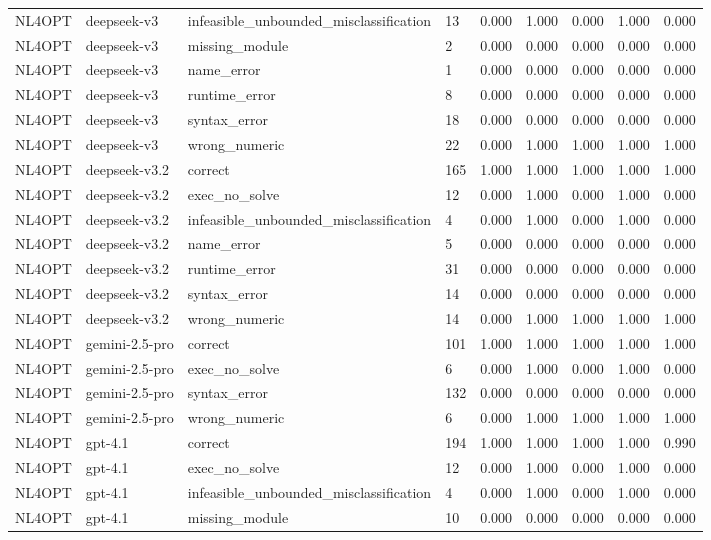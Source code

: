 \begin{table}[t]
\begin{tabular}{lllllllll}
NL4OPT & deepseek-v3 & infeasible\_unbounded\_misclassification & 13 & 0.000 & 1.000 & 0.000 & 1.000 & 0.000 \\
NL4OPT & deepseek-v3 & missing\_module & 2 & 0.000 & 0.000 & 0.000 & 0.000 & 0.000 \\
NL4OPT & deepseek-v3 & name\_error & 1 & 0.000 & 0.000 & 0.000 & 0.000 & 0.000 \\
NL4OPT & deepseek-v3 & runtime\_error & 8 & 0.000 & 0.000 & 0.000 & 0.000 & 0.000 \\
NL4OPT & deepseek-v3 & syntax\_error & 18 & 0.000 & 0.000 & 0.000 & 0.000 & 0.000 \\
NL4OPT & deepseek-v3 & wrong\_numeric & 22 & 0.000 & 1.000 & 1.000 & 1.000 & 1.000 \\
NL4OPT & deepseek-v3.2 & correct & 165 & 1.000 & 1.000 & 1.000 & 1.000 & 1.000 \\
NL4OPT & deepseek-v3.2 & exec\_no\_solve & 12 & 0.000 & 1.000 & 0.000 & 1.000 & 0.000 \\
NL4OPT & deepseek-v3.2 & infeasible\_unbounded\_misclassification & 4 & 0.000 & 1.000 & 0.000 & 1.000 & 0.000 \\
NL4OPT & deepseek-v3.2 & name\_error & 5 & 0.000 & 0.000 & 0.000 & 0.000 & 0.000 \\
NL4OPT & deepseek-v3.2 & runtime\_error & 31 & 0.000 & 0.000 & 0.000 & 0.000 & 0.000 \\
NL4OPT & deepseek-v3.2 & syntax\_error & 14 & 0.000 & 0.000 & 0.000 & 0.000 & 0.000 \\
NL4OPT & deepseek-v3.2 & wrong\_numeric & 14 & 0.000 & 1.000 & 1.000 & 1.000 & 1.000 \\
NL4OPT & gemini-2.5-pro & correct & 101 & 1.000 & 1.000 & 1.000 & 1.000 & 1.000 \\
NL4OPT & gemini-2.5-pro & exec\_no\_solve & 6 & 0.000 & 1.000 & 0.000 & 1.000 & 0.000 \\
NL4OPT & gemini-2.5-pro & syntax\_error & 132 & 0.000 & 0.000 & 0.000 & 0.000 & 0.000 \\
NL4OPT & gemini-2.5-pro & wrong\_numeric & 6 & 0.000 & 1.000 & 1.000 & 1.000 & 1.000 \\
NL4OPT & gpt-4.1 & correct & 194 & 1.000 & 1.000 & 1.000 & 1.000 & 0.990 \\
NL4OPT & gpt-4.1 & exec\_no\_solve & 12 & 0.000 & 1.000 & 0.000 & 1.000 & 0.000 \\
NL4OPT & gpt-4.1 & infeasible\_unbounded\_misclassification & 4 & 0.000 & 1.000 & 0.000 & 1.000 & 0.000 \\
NL4OPT & gpt-4.1 & missing\_module & 10 & 0.000 & 0.000 & 0.000 & 0.000 & 0.000 \\

\end{tabular}
\end{table}
